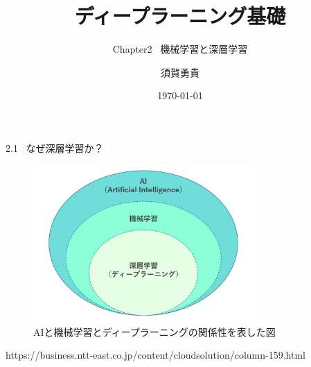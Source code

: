 \documentclass[dvipdfmx,10pt]{beamer}
\title{ディープラーニング基礎}
\subtitle{Chapter2 \ 機械学習と深層学習}
\author[須賀]{須賀勇貴}
\institute[茨大]{茨城大学大学院 \ 理工学研究科 \ 量子線科学専攻 \ 1年}
\date{\today}
\begin{document}
\frame{\maketitle}

  \begin{frame}{2.1 \ なぜ深層学習か？}
    \begin{figure}
      \begin{center}
        \includegraphics[height=6cm]{./AI_ML_DL.png}
      \end{center} 
      \caption{AIと機械学習とディープラーニングの関係性を表した図}  
    \end{figure}
    https://business.ntt-east.co.jp/content/cloudsolution/column-159.html
  \end{frame}
\end{document}
